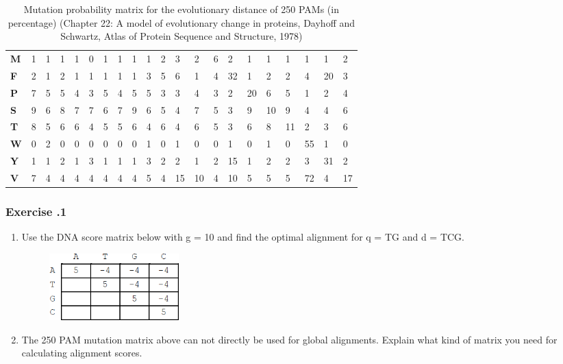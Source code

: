 \begin{table}[!ht]
\begin{tabular}{lllllllllllllllllllll}
\textbf{M} & 1   & 1   & 1   & 1   & 0   & 1   & 1   & 1   & 1   & 2   & 3   & 2   & 6   & 2   & 1   & 1   & 1   & 1   & 1   & 2   \\
\textbf{F} & 2   & 1   & 2   & 1   & 1   & 1   & 1   & 1   & 3   & 5   & 6   & 1   & 4   & 32  & 1   & 2   & 2   & 4   & 20  & 3   \\
\textbf{P} & 7   & 5   & 5   & 4   & 3   & 5   & 4   & 5   & 5   & 3   & 3   & 4   & 3   & 2   & 20  & 6   & 5   & 1   & 2   & 4   \\
\textbf{S} & 9   & 6   & 8   & 7   & 7   & 6   & 7   & 9   & 6   & 5   & 4   & 7   & 5   & 3   & 9   & 10  & 9   & 4   & 4   & 6   \\
\textbf{T} & 8   & 5   & 6   & 6   & 4   & 5   & 5   & 6   & 4   & 6   & 4   & 6   & 5   & 3   & 6   & 8   & 11  & 2   & 3   & 6   \\
\textbf{W} & 0   & 2   & 0   & 0   & 0   & 0   & 0   & 0   & 1   & 0   & 1   & 0   & 0   & 1   & 0   & 1   & 0   & 55  & 1   & 0   \\
\textbf{Y} & 1   & 1   & 2   & 1   & 3   & 1   & 1   & 1   & 3   & 2   & 2   & 1   & 2   & 15  & 1   & 2   & 2   & 3   & 31  & 2   \\
\textbf{V} & 7   & 4   & 4   & 4   & 4   & 4   & 4   & 4   & 5   & 4   & 15  & 10  & 4   & 10  & 5   & 5   & 5   & 72  & 4   & 17 
\end{tabular}
\caption{Mutation probability matrix for the evolutionary distance of 250 PAMs (in percentage) (Chapter 22: A model of evolutionary change in proteins, Dayhoff and Schwartz, Atlas of Protein Sequence and Structure, 1978)}
\end{table}

%
%
\subsubsection*{Exercise \thesection.1}
\begin{enumerate}
\item Use the DNA score matrix below with g = 10 and find the optimal alignment for q = TG and d = TCG.

\begin{figure}[H]
  \centering
      \includegraphics[width=0.25\textwidth]{fig03/dna_matrix_exercise.png}
\end{figure}

\item The 250 PAM mutation matrix above can not directly be used for global alignments. Explain what kind of matrix you need for calculating  alignment scores.
\end{enumerate}

\bigskip 

%
